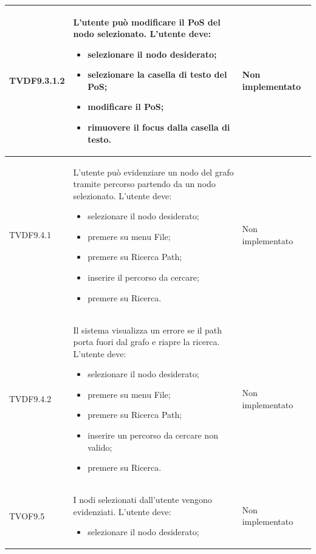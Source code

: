 \documentclass[openany,12pt,a4paper]{report}
\begin{document}
\begin{longtable}{| p{3cm} |p{8cm} | p{2.5cm} |}
	\newline TVDF9.3.1.2&
	\newline L'utente può modificare il PoS del nodo selezionato. L'utente deve:
	\begin{itemize}
		\item selezionare il nodo desiderato;
		\item selezionare la casella di testo del PoS;
		\item modificare il PoS;
		\item rimuovere il focus dalla casella di testo.
	\end{itemize}&
	\newline Non implementato
	\\[1em]
	\hline
	
	\newline TVDF9.4.1&
	\newline L'utente può evidenziare un nodo del grafo tramite percorso partendo da un nodo selezionato. L'utente deve:
	\begin{itemize}
		\item selezionare il nodo desiderato;
		\item premere su menu File;
		\item premere su Ricerca Path;
		\item inserire il percorso da cercare;
		\item premere su Ricerca.
	\end{itemize}&
	\newline Non implementato
	\\[1em]
	\hline
	
	\newline TVDF9.4.2&
	\newline Il sistema visualizza un errore se il path porta fuori dal grafo e riapre la ricerca. L'utente deve:
	\begin{itemize}
		\item selezionare il nodo desiderato;
		\item premere su menu File;
		\item premere su Ricerca Path;
		\item inserire un percorso da cercare non valido;
		\item premere su Ricerca.
	\end{itemize}&
	\newline Non implementato
	\\[1em]
	\hline
	
	\newline TVOF9.5&
	\newline I nodi selezionati dall'utente vengono evidenziati. L'utente deve:
	\begin{itemize}
		\item selezionare il nodo desiderato;
	\end{itemize}&
	\newline Non implementato
	\\[1em]
	\hline
	

\end{longtable}
\end{document}
